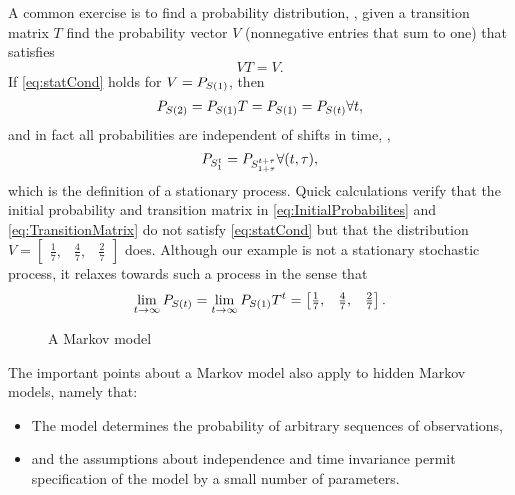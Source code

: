 A common exercise is to find a \emph{} probability
distribution, \ie, given a transition matrix $T$ find the probability
vector $V$ (nonnegative entries that sum to one) that satisfies
\begin{equation}
  \label{eq:statCond}
  VT = V.  
\end{equation}
If \eqref{eq:statCond} holds for $V = P_{{S}{(1)}}$, then
\begin{equation*}
  P_{{S}{(2)}}  = P_{{S}{(1)}}T = P_{{S}{(1)}} = P_{{S}{(t)}}
  \forall t,
\end{equation*}
and in fact all probabilities are independent of shifts in time, \ie,
\begin{equation*}
  P_{S_{1}^{t}} = P_{S_{1+\tau}^{t+\tau}} \forall (t,\tau),
\end{equation*}
which is the definition of a stationary process.  Quick calculations
verify that the initial probability and transition matrix in
\eqref{eq:InitialProbabilites} and \eqref{eq:TransitionMatrix} do not
satisfy \eqref{eq:statCond} but that the distribution $V =
\begin{bmatrix} \frac{1}{7}, & \frac{4}{7}, & \frac{2}{7}
\end{bmatrix}$ does.  Although our example is not a stationary
stochastic process, it relaxes towards such a process in the sense
that
\begin{equation*}
  \lim_{t \rightarrow \infty} P_{{S}{(t)}} =  \lim_{t \rightarrow
    \infty} P_{{S}{(1)}} T^t = \begin{bmatrix} \frac{1}{7}, & \frac{4}{7}, & \frac{2}{7}
\end{bmatrix}.
\end{equation*}

\begin{figure}[htbp]
  \centering{\plotsize%
    }
  \caption[A Markov model.]{A Markov model}
  \label{fig:mm}
\end{figure}

The important points about a Markov model also apply to hidden
Markov models, namely that:
\begin{itemize}
\item The model determines the probability of arbitrary sequences of
  observations,
\item and the assumptions about independence and time invariance
  permit specification of the model by a small number of parameters.
\end{itemize}

